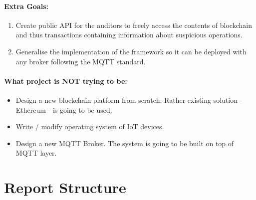 \paragraph{Extra Goals:}
\begin{enumerate}
  \item Create public API for the auditors to freely access the contents of blockchain and thus transactions containing information about suspicious operations.
  \item Generalise the implementation of the framework so it can be deployed with any broker following the MQTT standard.
\end{enumerate}

\paragraph{What project is NOT trying to be:}
\begin{itemize}
  \item Design a new blockchain platform from scratch. Rather existing solution - Ethereum - is going to be used.
  \item Write / modify operating system of IoT devices.
  \item Design a new MQTT Broker. The system is going to be built on top of MQTT layer.
\end{itemize}

\section{Report Structure}


